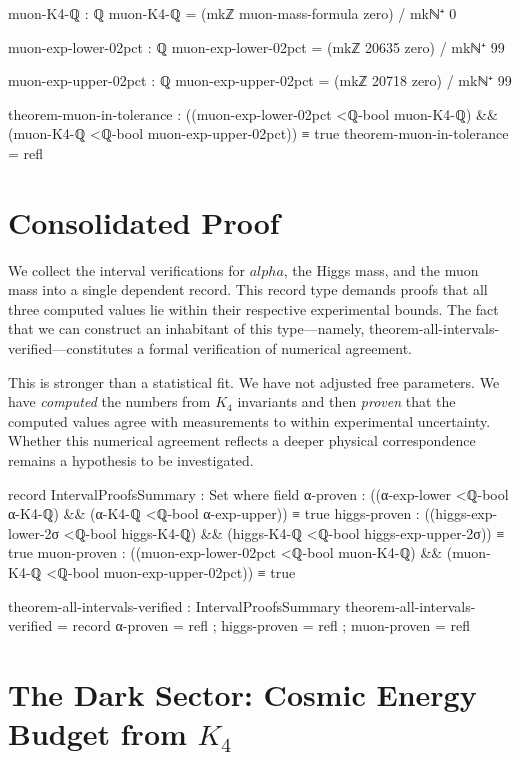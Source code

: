 \documentclass[11pt,a4paper]{book}
\def\alpha{alpha}%
\def\texttt#1{#1}%
\begin{document}
\begin{code}
muon-K4-ℚ : ℚ
muon-K4-ℚ = (mkℤ muon-mass-formula zero) / mkℕ⁺ 0

muon-exp-lower-02pct : ℚ
muon-exp-lower-02pct = (mkℤ 20635 zero) / mkℕ⁺ 99

muon-exp-upper-02pct : ℚ
muon-exp-upper-02pct = (mkℤ 20718 zero) / mkℕ⁺ 99

theorem-muon-in-tolerance : ((muon-exp-lower-02pct <ℚ-bool muon-K4-ℚ) && (muon-K4-ℚ <ℚ-bool muon-exp-upper-02pct)) ≡ true
theorem-muon-in-tolerance = refl
\end{code}

\section{Consolidated Proof}

We collect the interval verifications for $\alpha$, the Higgs mass, and the muon mass into 
a single dependent record. This record type demands proofs that all three computed values lie 
within their respective experimental bounds. The fact that we can construct an inhabitant of 
this type---namely, \texttt{theorem-all-intervals-verified}---constitutes a formal verification 
of numerical agreement.

This is stronger than a statistical fit. We have not adjusted free parameters. We have 
\emph{computed} the numbers from $K_4$ invariants and then \emph{proven} that the computed values 
agree with measurements to within experimental uncertainty. Whether this numerical agreement 
reflects a deeper physical correspondence remains a hypothesis to be investigated.

\begin{code}
record IntervalProofsSummary : Set where
  field
    α-proven : ((α-exp-lower <ℚ-bool α-K4-ℚ) && (α-K4-ℚ <ℚ-bool α-exp-upper)) ≡ true
    higgs-proven : ((higgs-exp-lower-2σ <ℚ-bool higgs-K4-ℚ) && (higgs-K4-ℚ <ℚ-bool higgs-exp-upper-2σ)) ≡ true
    muon-proven : ((muon-exp-lower-02pct <ℚ-bool muon-K4-ℚ) && (muon-K4-ℚ <ℚ-bool muon-exp-upper-02pct)) ≡ true

theorem-all-intervals-verified : IntervalProofsSummary
theorem-all-intervals-verified = record
  { α-proven = refl
  ; higgs-proven = refl
  ; muon-proven = refl
  }
\end{code}

\section[The Dark Sector: Cosmic Energy Budget from K4]{The Dark Sector: Cosmic Energy Budget from $K_4$}
\label{sec:dark-sectors}
\end{document}
